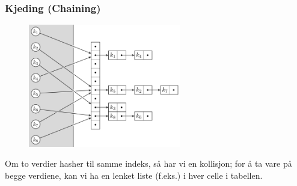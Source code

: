 \documentclass[12pt]{report}
\begin{document}
\subsubsection*{Kjeding (Chaining)}



\begin{figure}[H]
\advance\leftskip 4.38in		\includegraphics[width=2.61in,height=2.11in]{./media/image19.png}
\end{figure}



Om to verdier hasher til samme indeks, så har vi en kollisjon; for å ta vare på begge verdiene, kan vi ha en lenket liste (f.eks.) i hver celle i tabellen.\par
\end{document}
